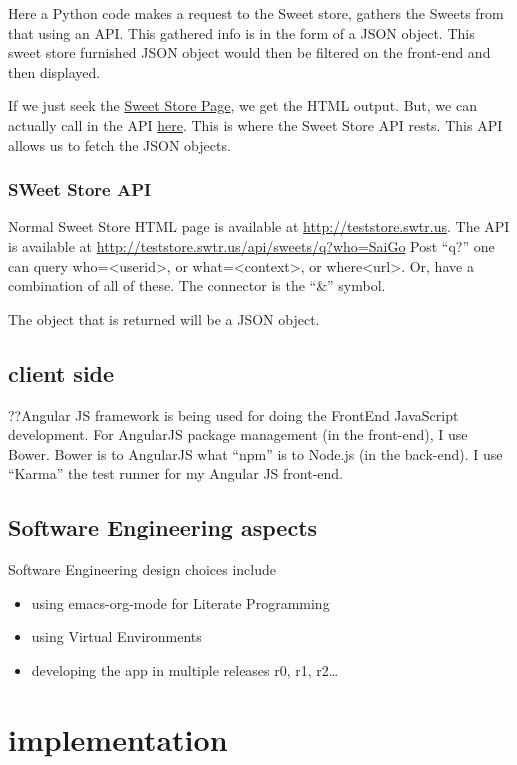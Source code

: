 \documentclass[11pt]{article}
\begin{document}
Here a Python code makes a request to the Sweet store, gathers the
Sweets from that using an API. This gathered info is in the form of a
JSON object. This sweet store furnished JSON object would then be
filtered on the front-end and then displayed.

If we just seek the \href{http://teststore.swtr.us}{Sweet Store Page}, we get the HTML output. But, we
can actually call in the API \href{http://teststore.swtr.us/api/sweets/q?who=SaiGo}{here}. This is where the Sweet Store API
rests. This API allows us to fetch the JSON objects.  
\subsubsection{SWeet Store API}
\label{sec-3-3-2}

Normal Sweet Store HTML page is available at
\href{http://teststore.swtr.us}{http://teststore.swtr.us}. The API is available at \href{http://teststore.swtr.us/api/sweets/q?who=SaiGo}{http://teststore.swtr.us/api/sweets/q?who=SaiGo} 
Post ``q?'' one can query who=<userid>, or what=<context>, or
where<url>. Or, have a combination of all of these. The connector is
the ``\&'' symbol. 

The object that is returned will be a JSON object. 
\subsection{client side}
\label{sec-3-4}

??Angular JS framework is being used for doing the FrontEnd JavaScript
development. For AngularJS package management (in the front-end), I
use Bower. Bower is to AngularJS what ``npm'' is to Node.js (in the
back-end). I use ``Karma'' the test runner for my Angular JS front-end.
\subsection{Software Engineering aspects}
\label{sec-3-5}

Software Engineering design choices include
\begin{itemize}
\item using emacs-org-mode for Literate Programming
\item using Virtual Environments
\item developing the app in multiple releases r0, r1, r2\ldots{}
\end{itemize}
\section{implementation}
\label{sec-4}
\end{document}
